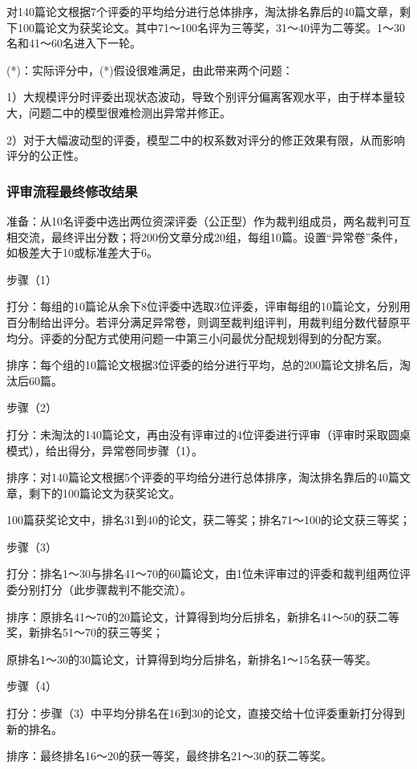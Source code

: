 \documentclass{my_paper}
\begin{document}
	 对140篇论文根据7个评委的平均给分进行总体排序，淘汰排名靠后的40篇文章，剩下100篇论文为获奖论文。其中71～100名评为三等奖，31～40评为二等奖。1～30名和41～60名进入下一轮。
	 
	 (*)：实际评分中，(*)假设很难满足，由此带来两个问题：
	 
	 1）大规模评分时评委出现状态波动，导致个别评分偏离客观水平，由于样本量较大，问题二中的模型很难检测出异常并修正。
	 
	 2）对于大幅波动型的评委，模型二中的权系数对评分的修正效果有限，从而影响评分的公正性。
	 
	 \subsubsection{评审流程最终修改结果}
	 准备：从10名评委中选出两位资深评委（公正型）作为裁判组成员，两名裁判可互相交流，最终评出分数；将200份文章分成20组，每组10篇。设置“异常卷”条件，如极差大于10或标准差大于6。
	 
	 步骤（1）
	 
	 打分：每组的10篇论从余下8位评委中选取3位评委，评审每组的10篇论文，分别用百分制给出评分。若评分满足异常卷，则调至裁判组评判，用裁判组分数代替原平均分。评委的分配方式使用问题一中第三小问最优分配规划得到的分配方案。
	 
	 排序：每个组的10篇论文根据3位评委的给分进行平均，总的200篇论文排名后，淘汰后60篇。
	 
	 步骤（2）
	 
	 打分：未淘汰的140篇论文，再由没有评审过的4位评委进行评审（评审时采取圆桌模式），给出得分，异常卷同步骤（1）。
	 
	 排序：对140篇论文根据5个评委的平均给分进行总体排序，淘汰排名靠后的40篇文章，剩下的100篇论文为获奖论文。
	 
	 100篇获奖论文中，排名31到40的论文，获二等奖；排名71～100的论文获三等奖；
	 
	 步骤（3）
	 
	 打分：排名1～30与排名41～70的60篇论文，由1位未评审过的评委和裁判组两位评委分别打分（此步骤裁判不能交流）。
	 
	 排序：原排名41～70的20篇论文，计算得到均分后排名，新排名41～50的获二等奖，新排名51～70的获三等奖；
	 
	 原排名1～30的30篇论文，计算得到均分后排名，新排名1～15名获一等奖。
	 
	 步骤（4）
	 
	 打分：步骤（3）中平均分排名在16到30的论文，直接交给十位评委重新打分得到新的排名。
	 
	 排序：最终排名16～20的获一等奖，最终排名21～30的获二等奖。
	
\end{document}
